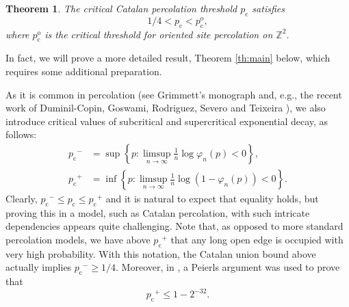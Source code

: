 \documentclass[pdflatex,sn-mathphys-num]{sn-jnl}%
\newcommand{\bbZ}{{\ensuremath{\mathbb Z}} }
\newcommand{\1}{{\ensuremath{\mathbf{1}}} }
\newcommand{\pc}{\ensuremath{p_{\mathrm{c}} }}
\newcommand{\pco}{\ensuremath{p_{\mathrm{c}}^{\mathrm{o}} }}
\theoremstyle{thmstyleone}%
\newtheorem{theorem}{Theorem}%
\theoremstyle{thmstyletwo}%
\theoremstyle{thmstylethree}%
\begin{document}
\begin{theorem}
The critical Catalan percolation threshold $\pc$
satisfies 
\[
1/4< \pc<\pco,
\] 
where 
$\pco$ is the critical threshold for oriented site percolation on $\bbZ^2$. 
\end{theorem}

In fact, we will prove a more detailed result, Theorem \ref{th:main} below, 
which requires some additional preparation.

As it is common in percolation (see Grimmett's monograph \cite{Grimmett99} and, e.g., 
the recent work of Duminil-Copin, Goswami, Rodriguez, Severo and Teixeira \cite{Duminil-Copin23a}),
we also introduce critical values of subcritical and supercritical exponential decay, as follows: 
\begin{align}
\label{eq:def:p-}\pc^- &{}= \sup \left\{p: \limsup_{n\to \infty} \frac 1n \log \varphi_n(p)<0 \right\},\\
\label{eq:def:p+}\pc^+&{}=\inf\left\{p:\limsup_{n\to \infty} \frac 1n\log (1-\varphi_n(p)) <0\right\}.
\end{align}
Clearly, $\pc^-\le\pc\le\pc^+$ and it is natural to expect that equality holds, but proving this in a model, 
such as Catalan percolation, 
with such intricate dependencies appears quite challenging. Note that, 
as opposed to more standard percolation models, we have 
above $\pc^+$
that any long open edge is occupied with very high probability. With this notation, the Catalan union bound above actually implies $\pc^-\ge 1/4$. Moreover, in \cite[Section 3]{Gravner23}, a Peierls argument was used to prove that 
\begin{equation}
\label{eq:GK2}\pc^+\le 1-2^{-32}.
\end{equation}





\end{document}
